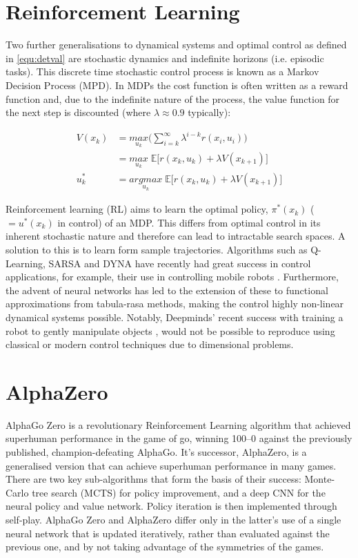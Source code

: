 \documentclass[../main.tex]{subfiles}
\begin{document}
\section{Reinforcement Learning}
Two further generalisations to dynamical systems and optimal control as defined in \cref{equ:detval} are stochastic dynamics and indefinite horizons (i.e. episodic tasks). This discrete time stochastic control process is known as a Markov Decision Process (MPD). In MDPs the cost function is often written as a reward function and, due to the indefinite nature of the process, the value function for the next step is discounted (where $\lambda \approx 0.9$ typically):

\begin{align}
    \label{equ:mdpval} 
    V(x_k) & = \underset{u_k}{max} \bigg( \sum_{i=k}^{\infty} \lambda^{i-k} r(x_i, u_i) \bigg) \\ 
    & = \underset{u_k}{max} \; \mathbb{E} \Big[ r(x_k, u_k) + \lambda V(x_{k+1}) \Big] \\
    u^{*}_k & = \underset{u_k}{argmax}\; \mathbb{E} \Big[ r(x_k, u_k) + \lambda V(x_{k+1}) \Big]
\end{align}

Reinforcement learning (RL) aims to learn the optimal policy, $\pi^{*}(x_k)$ ($=u^{*}(x_k)$ in control) of an MDP. This differs from optimal control in its inherent stochastic nature and therefore can lead to intractable search spaces. A solution to this is to learn form sample trajectories. Algorithms such as Q-Learning, SARSA and DYNA have recently had great success in control applications, for example, their use in controlling mobile robots \cite{Qlearning, RLoverview}. Furthermore, the advent of neural networks has led to the extension of these to functional approximations from tabula-rasa methods, making the control highly non-linear dynamical systems possible. Notably, Deepminds' recent success with training a robot to gently manipulate objects \cite{Robothand}, would not be possible to reproduce using classical or modern control techniques due to dimensional problems.

\section{AlphaZero}
AlphaGo Zero is a revolutionary Reinforcement Learning algorithm that achieved superhuman performance in the game of go, winning 100–0 against the previously published, champion-defeating AlphaGo. It's successor, AlphaZero, is a generalised version that can achieve superhuman performance in many games. There are two key sub-algorithms that form the basis of their success: Monte-Carlo tree search (MCTS) for policy improvement, and a deep CNN for the neural policy and value network. Policy iteration is then implemented through self-play. AlphaGo Zero and AlphaZero differ only in the latter's use of a single neural network that is updated iteratively, rather than evaluated against the previous one, and by not taking advantage of the symmetries of the games.
\end{document}
